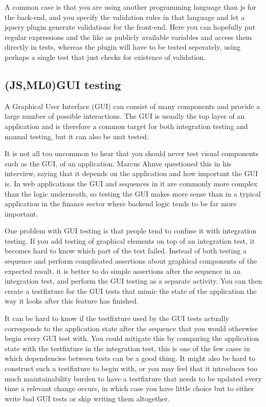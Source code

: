 \documentclass[11pt]{article}
\begin{document}
A common case is that you are using another programming language than \gls{js} for the back-end, and you specify the validation rules in that language and let a jquery plugin generate validations for the front-end. Here you can hopefully put regular expressions and the like as publicly available variables and access them directly in tests, whereas the plugin will have to be tested seperately, using perhaps a single test that just checks for existence of validation.

\subsection{(JS,ML0)GUI testing}

A Graphical User Interface (GUI) can consist of many components and provide a large number of possible interactions. The GUI is usually the top layer of an application and is therefore a common target for both integration testing and manual testing, but it can also be unit tested.

It is not all too uncommon to hear that you should never test visual components such as the GUI, of an application. Marcus Ahnve questioned this in his interview, saying that it depends on the application and how important the GUI is. In web applications the GUI and sequences in it are commonly more complex than the logic underneath, so testing the GUI makes more sense than in a typical application in the finance sector where backend logic tends to be far more important. \cite[question~21]{Ahnve}

One problem with GUI testing is that people tend to confuse it with integration testing. If you add testing of graphical elements on top of an integration test, it becomes hard to know which part of the test failed. Instead of both testing a sequence and perform complicated assertions about graphical components of the expected result, it is better to do simple assertions after the sequence in an integration test, and perform the GUI testing as a separate activity. You can then create a \gls{testfixture} for the GUI tests that mimic the state of the application the way it looks after this feature has finished.

It can be hard to know if the \gls{testfixture} used by the GUI tests actually corresponds to the application state after the sequence that you would otherwise begin every GUI test with. You could mitigate this by comparing the application state with the \gls{testfixture} in the integration test, this is one of the few cases in which dependencies between tests can be a good thing. It might also be hard to construct such a \gls{testfixture} to begin with, or you may feel that it introduces too much maintainability burden to have a \gls{testfixture} that needs to be updated every time a relevant change occurs, in which case you have little choice but to either write bad GUI tests or skip writing them altogether.
\end{document}

